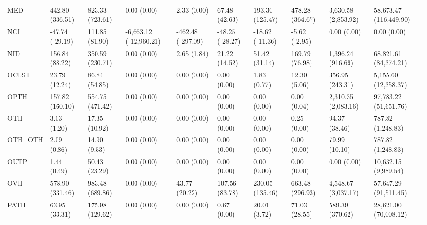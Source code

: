 \begin{tabular}{llllllllll}
MED      &      442.80 (336.51) &      823.33 (723.61) &                0.00 (0.00) &            2.33 (0.00) &    67.48 (42.63) &    193.30 (125.47) &      478.28 (364.67) &    3,630.58 (2,853.92) &   58,673.47 (116,449.90) \\
NCI      &      -47.74 (-29.19) &       111.85 (81.90) &     -6,663.12 (-12,960.21) &      -462.48 (-297.09) &  -48.25 (-28.27) &    -18.62 (-11.36) &        -5.62 (-2.95) &            0.00 (0.00) &              0.00 (0.00) \\
NID      &       156.84 (88.22) &      350.59 (230.71) &                0.00 (0.00) &            2.65 (1.84) &    21.22 (14.52) &      51.42 (31.14) &       169.79 (76.98) &      1,396.24 (916.69) &    68,821.61 (84,374.21) \\
OCLST    &        23.79 (12.24) &        86.84 (54.85) &                0.00 (0.00) &            0.00 (0.00) &      0.00 (0.00) &        1.83 (0.77) &         12.30 (5.06) &        356.95 (243.31) &     5,155.60 (12,358.37) \\
OPTH     &      157.82 (160.10) &      554.75 (471.42) &                0.00 (0.00) &            0.00 (0.00) &      0.00 (0.00) &        0.00 (0.00) &          0.00 (0.04) &    2,310.35 (2,083.16) &    97,783.22 (51,651.76) \\
OTH      &          3.03 (1.20) &        17.35 (10.92) &                0.00 (0.00) &            0.00 (0.00) &      0.00 (0.00) &        0.00 (0.00) &          0.25 (0.00) &          94.37 (38.46) &        787.82 (1,248.83) \\
OTH\_OTH  &          2.09 (0.86) &         14.90 (9.53) &                0.00 (0.00) &            0.00 (0.00) &      0.00 (0.00) &        0.00 (0.00) &          0.00 (0.00) &          79.99 (10.10) &        787.82 (1,248.83) \\
OUTP     &          1.44 (0.49) &        50.43 (23.29) &                0.00 (0.00) &            0.00 (0.00) &      0.00 (0.00) &        0.00 (0.00) &          0.00 (0.00) &            0.00 (0.00) &     10,632.15 (9,989.54) \\
OVH      &      578.90 (331.46) &      983.48 (689.86) &                0.00 (0.00) &          43.77 (20.22) &   107.56 (83.78) &    230.05 (135.46) &      663.48 (296.93) &    4,548.67 (3,037.17) &    57,647.29 (91,511.45) \\
PATH     &        63.95 (33.31) &      175.98 (129.62) &                0.00 (0.00) &            0.00 (0.00) &      0.67 (0.00) &       20.01 (3.72) &        71.03 (28.55) &        589.39 (370.62) &    28,621.00 (70,008.12) \\

\end{tabular}
